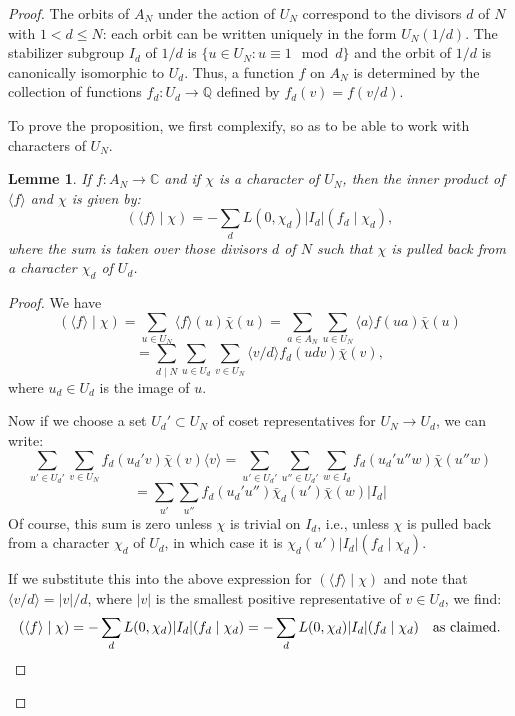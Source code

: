 \documentclass[12pt,a4paper]{article}
\theoremstyle{plain}
\newtheorem{lemma}[theorem]{Lemme}
\theoremstyle{definition}
\theoremstyle{remark}
\newcommand{\Q}{\mathbb{Q}}
\newcommand{\C}{\mathbb{C}}
\begin{document}
\begin{proof}
The orbits of $A_N$ under the action of $U_N$ correspond to the divisors $d$ of
$N$ with $1 < d \leq N$: each orbit can be written uniquely in the form
$U_N(1/d)$. The stabilizer subgroup $I_d$ of $1/d$ is
$\{u \in U_N: u \equiv 1 \mod d\}$ and the orbit of $1/d$ is canonically
isomorphic to $U_d$. Thus, a function $f$ on $A_N$ is determined by the collection
of functions $f_d: U_d \to \Q$ defined by $f_d(v) = f(v/d)$.

To prove the proposition, we first complexify, so as to be able to work with
characters of $U_N$.

\begin{lemma}
If $f: A_N \to \C$ and if $\chi$ is a character of $U_N$, then the inner product of
$\langle f \rangle$ and $\chi$ is given by:
\[
(\langle f \rangle \mid \chi) = -\sum_d L(0, \chi_d) |I_d| (f_d \mid \chi_d),
\]
where the sum is taken over those divisors $d$ of $N$ such that $\chi$ is pulled
back from a character $\chi_d$ of $U_d$.
\end{lemma}

\begin{proof}
We have
\[
(\langle f \rangle \mid \chi) = \sum_{u \in U_N} \langle f \rangle(u) \bar{\chi}(u)
= \sum_{a \in A_N} \sum_{u \in U_N} \langle a \rangle f(ua) \bar{\chi}(u)
\]
\[
= \sum_{d \mid N} \sum_{u \in U_d} \sum_{v \in U_N} \langle v/d \rangle f_d(udv) \bar{\chi}(v),
\]
where $u_d \in U_d$ is the image of $u$.

Now if we choose a set $U_d' \subset U_N$ of coset representatives for
$U_N \to U_d$, we can write:
\[
\sum_{u' \in U_d'} \sum_{v \in U_N} f_d(u_d' v) \bar{\chi}(v) \langle v \rangle
= \sum_{u' \in U_d'} \sum_{u'' \in U_d'} \sum_{w \in I_d} f_d(u_d' u'' w) \bar{\chi}(u'' w)
\]
\[
= \sum_{u'} \sum_{u''} f_d(u_d' u'') \bar{\chi}_d(u') \bar{\chi}(w) |I_d|
\]
Of course, this sum is zero unless $\chi$ is trivial on $I_d$, i.e., unless $\chi$ is pulled
back from a character $\chi_d$ of $U_d$, in which case it is
$\chi_d(u') |I_d| (f_d \mid \chi_d)$.

If we substitute this into the above expression for $(\langle f \rangle \mid \chi)$ and
note that $\langle v/d \rangle = |v|/d$, where $|v|$ is the smallest positive representative
of $v \in U_d$, we find:
\[
(\langle f \rangle \mid \chi) = -\sum_d L(0, \chi_d) |I_d| (f_d \mid \chi_d)
= -\sum_d L(0, \chi_d) |I_d| (f_d \mid \chi_d) \quad \text{as claimed.} \qedhere
\]
\end{proof}


\end{proof}
\end{document}
